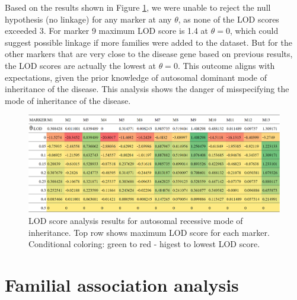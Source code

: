 \documentclass[a4paper,12pt]{article}
\begin{document}
Based on the results shown in Figure \ref{fig:xrec_lod}, we were unable to reject the null hypothesis (no linkage) 
for any marker at any $\theta$, as none of the LOD scores exceeded 3. For marker 9
maximum LOD score is 1.4 at $\theta = 0$, which could suggest possible linkage if more families 
were added to the dataset. But for the other markers that are very close to the disease gene based on previous 
results, the LOD scores are actually the lowest at $\theta = 0$.
This outcome aligns with expectations, given the prior knowledge of autosomal 
dominant mode of inheritance of the disease. This analysis shows the danger of misspecifying the mode of inheritance 
of the disease.
\begin{figure}
    \centering
    \includegraphics[width=\textwidth]{images/xrec_lod.png}
    \caption{LOD score analysis results for autosomal recessive mode of inheritance. Top row shows 
    maximum LOD score for each marker. Conditional coloring: green to red - higest to lowest LOD score.}
    \label{fig:xrec_lod}

\end{figure}


\section{Familial association analysis}
\end{document}
